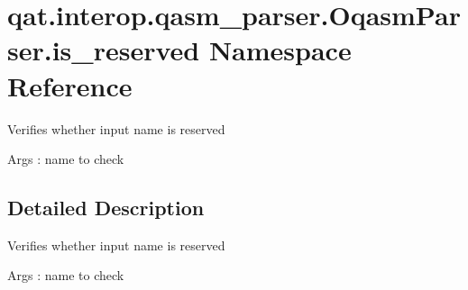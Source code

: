 \hypertarget{namespaceqat_1_1interop_1_1qasm__parser_1_1OqasmParser_1_1is__reserved}{\section{qat.\-interop.\-qasm\-\_\-parser.\-Oqasm\-Parser.\-is\-\_\-reserved Namespace Reference}
\label{namespaceqat_1_1interop_1_1qasm__parser_1_1OqasmParser_1_1is__reserved}
}


\begin{DoxyVerb}Verifies whether input name is reserved
\end{DoxyVerb}
 Args \-: name to check  




\subsection{Detailed Description}
\begin{DoxyVerb}Verifies whether input name is reserved
\end{DoxyVerb}
 Args \-: name to check 